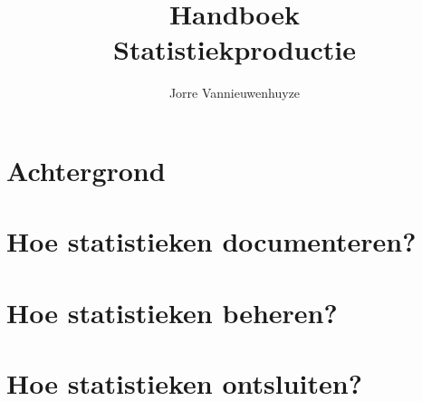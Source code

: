 \documentclass[SV]{VSAbook}
\title{Handboek\\Statistiekproductie}
\author{Jorre Vannieuwenhuyze}
\newcommand\includesubfile[1]{{
    \providecommand\subfiledir{#1}
    
    }}
\begin{document}
	


\titlepage


\tableofcontents


\includesubfile{../01_Inleiding/text/01_Inleiding}

\part{Achtergrond}

\includesubfile{../02_Wat_is_een_statistiek/text/Wat_is_een_statistiek}


\part{Hoe statistieken documenteren?}


\part{Hoe statistieken beheren?}


\part{Hoe statistieken ontsluiten?}


%
%
%




\printbibliography








%
%










	
\end{document}
